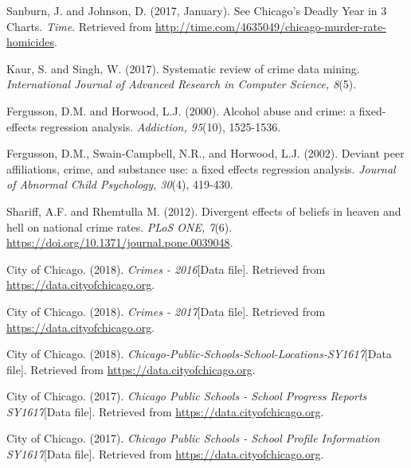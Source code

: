 \documentclass[12pt]{article}
\begin{document}
	\newpage
\begin{thebibliography}{10}
	
Sanburn, J. and Johnson, D. (2017, January). See Chicago's Deadly Year in 3 Charts. \textit{Time}. Retrieved from \href{http://time.com/4635049/chicago-murder-rate-homicides}{http://time.com/4635049/chicago-murder-rate-homicides}.

Kaur, S. and Singh, W. (2017). Systematic review of crime data mining. \textit{International Journal of Advanced Research in Computer Science, 8}(5).

Fergusson, D.M. and Horwood, L.J. (2000). Alcohol abuse and crime: a fixed-effects regression analysis. \textit{Addiction, 95}(10), 1525-1536.

Fergusson, D.M., Swain-Campbell, N.R., and Horwood, L.J. (2002). Deviant peer affiliations, crime, and substance use: a fixed effects regression analysis. \textit{Journal of Abnormal Child Psychology, 30}(4), 419-430.

Shariff, A.F. and Rhemtulla M. (2012). Divergent effects of beliefs in heaven and hell on national crime rates. \textit{PLoS ONE, 7}(6). \href{https://doi.org/10.1371/journal.pone.0039048}{https://doi.org/10.1371/journal.pone.0039048}.

City of Chicago. (2018). \textit{Crimes - 2016}[Data file]. Retrieved from \href{https://data.cityofchicago.org}{https://data.cityofchicago.org}.

City of Chicago. (2018). \textit{Crimes - 2017}[Data file]. Retrieved from \href{https://data.cityofchicago.org}{https://data.cityofchicago.org}.

City of Chicago. (2018). \textit{Chicago-Public-Schools-School-Locations-SY1617}[Data file]. Retrieved from \href{https://data.cityofchicago.org}{https://data.cityofchicago.org}.

City of Chicago. (2017). \textit{Chicago Public Schools - School Progress Reports SY1617}[Data file]. Retrieved from \href{https://data.cityofchicago.org}{https://data.cityofchicago.org}.

City of Chicago. (2017). \textit{Chicago Public Schools - School Profile Information SY1617}[Data file]. Retrieved from \href{https://data.cityofchicago.org}{https://data.cityofchicago.org}.

\end{thebibliography}
\end{document}

